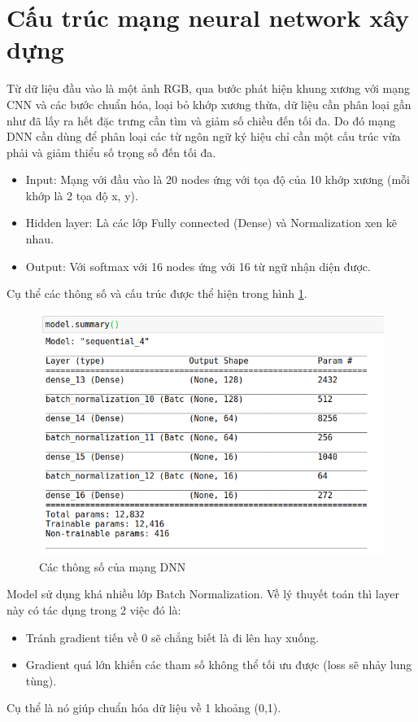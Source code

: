 \section{Cấu trúc mạng neural network xây dựng}
Từ dữ liệu đầu vào là một ảnh RGB, qua bước phát hiện khung xương với mạng CNN và các bước chuẩn hóa, loại bỏ khớp xương thừa, dữ liệu cần phân loại gần như đã lấy ra hết đặc trưng cần tìm và giảm số chiều đến tối đa. Do đó mạng DNN cần dùng để phân loại các từ ngôn ngữ ký hiệu chỉ cần một cấu trúc vừa phải và giảm thiểu số trọng số đến tối đa.

\begin{itemize}
\item Input: Mạng với đầu vào là 20 nodes ứng với tọa độ của 10 khớp xương (mỗi khớp là 2 tọa độ x, y).
\item Hidden layer: Là các lớp Fully connected (Dense) và Normalization xen kẽ nhau.
\item Output: Với softmax với 16 nodes ứng với 16 từ ngữ nhận diện được.
\end{itemize}
Cụ thể các thông số và cấu trúc được thể hiện trong hình \ref{fig:model_params}.

\FloatBarrier
\begin{figure}[htp]
\begin{center}
\includegraphics[scale=1.2]{chap4/c4_figs/model_param.png}
\end{center}
\caption{Các thông số của mạng DNN}
\label{fig:model_params}
\end{figure}
\FloatBarrier


Model sử dụng khá nhiều lớp Batch Normalization. Về lý thuyết toán thì layer này có tác dụng trong 2 việc đó là:
\begin{itemize}
\item Tránh gradient tiến về 0 sẽ chẳng biết là đi lên hay xuống.
\item Gradient quá lớn khiến các tham số không thể tối ưu được (loss sẽ nhảy lung tùng).
\end{itemize}
Cụ thể là nó giúp chuẩn hóa dữ liệu về 1 khoảng (0,1).


